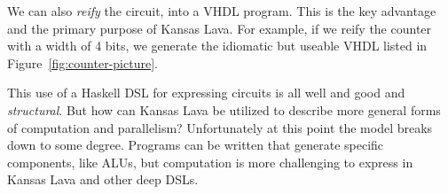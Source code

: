 \documentclass[11pt]{article}
\begin{document}
We can also {\em reify\/} the circuit, into
a VHDL program. This is the key advantage and the
primary purpose of Kansas Lava. For example,
if we reify the counter with a width of 4 bits, we generate
the idiomatic but useable VHDL
listed in Figure~\ref{fig:counter-picture}.

This use of a Haskell DSL for expressing circuits
is all well and good and {\em structural\/}.
But how can Kansas Lava be utilized to
describe more general forms of computation and parallelism?
Unfortunately at this point the model breaks down
to some degree. Programs can be written
that generate specific components, like ALUs,
but computation is more challenging to express
in Kansas Lava and other deep DSLs.
\end{document}
